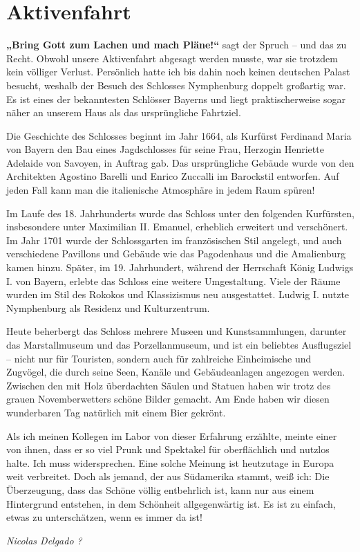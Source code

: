 \section{Aktivenfahrt}

\begin{multicols}{2}

\textbf{„Bring Gott zum Lachen und mach Pläne!“}
sagt der Spruch – und das zu Recht. Obwohl unsere Aktivenfahrt abgesagt werden musste,
war sie trotzdem kein völliger Verlust. Persönlich hatte ich bis dahin noch
keinen deutschen Palast besucht, weshalb der Besuch des Schlosses Nymphenburg
doppelt großartig war. Es ist eines der bekanntesten Schlösser Bayerns und
liegt praktischerweise sogar näher an unserem Haus als das ursprüngliche
Fahrtziel.

Die Geschichte des Schlosses beginnt im Jahr 1664, als Kurfürst Ferdinand
Maria von Bayern den Bau eines Jagdschlosses für seine Frau, Herzogin Henriette
Adelaide von Savoyen, in Auftrag gab. Das ursprüngliche Gebäude wurde von den
Architekten Agostino Barelli und Enrico Zuccalli im Barockstil entworfen. Auf
jeden Fall kann man die italienische Atmosphäre in jedem Raum spüren!

Im Laufe des 18. Jahrhunderts wurde das Schloss unter den folgenden
Kurfürsten, insbesondere unter Maximilian II. Emanuel, erheblich erweitert und
verschönert. Im Jahr 1701 wurde der Schlossgarten im französischen Stil
angelegt, und auch verschiedene Pavillons und Gebäude wie das Pagodenhaus und
die Amalienburg kamen hinzu. Später, im 19. Jahrhundert, während der Herrschaft
König Ludwigs I. von Bayern, erlebte das Schloss eine weitere Umgestaltung.
Viele der Räume wurden im Stil des Rokokos und Klassizismus neu ausgestattet. Ludwig
I. nutzte Nymphenburg als Residenz und Kulturzentrum.

Heute beherbergt das Schloss mehrere Museen und Kunstsammlungen, darunter
das Marstallmuseum und das Porzellanmuseum, und ist ein beliebtes Ausflugsziel
– nicht nur für Touristen, sondern auch für zahlreiche Einheimische und
Zugvögel, die durch seine Seen, Kanäle und Gebäudeanlagen angezogen werden. Zwischen
den mit Holz überdachten Säulen und Statuen haben wir trotz des grauen
Novemberwetters schöne Bilder gemacht. Am Ende haben wir diesen wunderbaren Tag
natürlich mit einem Bier gekrönt.

Als ich meinen Kollegen im Labor von dieser Erfahrung erzählte, meinte
einer von ihnen, dass er so viel Prunk und Spektakel für oberflächlich und
nutzlos halte. Ich muss widersprechen. Eine solche Meinung ist heutzutage in
Europa weit verbreitet. Doch als jemand, der aus Südamerika stammt, weiß ich:
Die Überzeugung, dass das Schöne völlig entbehrlich ist, kann nur aus einem
Hintergrund entstehen, in dem Schönheit allgegenwärtig ist. Es ist zu einfach,
etwas zu unterschätzen, wenn es immer da ist!

	\begin{flushright}
		\hfill\emph{Nicolas Delgado ?}
	\end{flushright}
\end{multicols}
%

